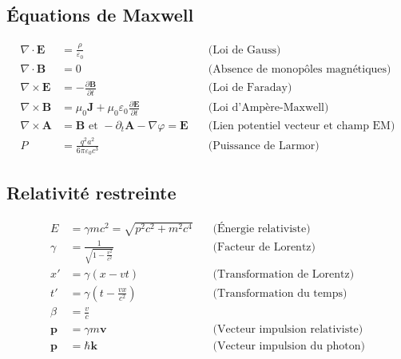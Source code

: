 \documentclass[a4paper,10pt]{report}
\begin{document}
	\subsection{Équations de Maxwell}\label{subsubsec:maxwell}
	\begin{align*}
		\nabla \cdot \mathbf{E} &= \frac{\rho}{\varepsilon_0} \quad & \text{(Loi de Gauss)} \\
		\nabla \cdot \mathbf{B} &= 0 \quad & \text{(Absence de monopôles magnétiques)} \\
		\nabla \times \mathbf{E} &= - \frac{\partial \mathbf{B}}{\partial t} \quad & \text{(Loi de Faraday)} \\
		\nabla \times \mathbf{B} &= \mu_0 \mathbf{J} + \mu_0 \varepsilon_0 \frac{\partial \mathbf{E}}{\partial t} \quad & \text{(Loi d'Ampère-Maxwell)}\\
		\nabla \times \textbf{A} &= \textbf{B} \text{ et } -\partial_t \textbf{A} - \nabla \varphi = \textbf{E} \quad & \text{(Lien potentiel vecteur et champ EM)}\\
			P &= \frac{q^2 a^2}{6\pi \varepsilon_0 c^3}
		\label{formule:larmor} \quad & \text{(Puissance de Larmor)}
	\end{align*}
	
	
	\subsection{Relativité restreinte}\label{subsubsec:relativite}
	\begin{align*}
		E &= \gamma mc^2 = \sqrt{p^2c^2+m^2c^4}\quad & \text{(Énergie relativiste)} \\
		\gamma &= \frac{1}{\sqrt{1 - \frac{v^2}{c^2}}} \quad & \text{(Facteur de Lorentz)} \\
		x' &= \gamma (x - vt) \quad & \text{(Transformation de Lorentz)} \\
		t' &= \gamma \left(t - \frac{vx}{c^2}\right) \quad & \text{(Transformation du temps)}\\
		\beta &= \frac v c\\
		\textbf{p} &= \gamma m \textbf{v} \quad & \text{(Vecteur impulsion relativiste)}\\
		\textbf{p} &= \hbar \textbf{k} \quad & \text{(Vecteur impulsion du photon)}
	\end{align*}
\end{document}
